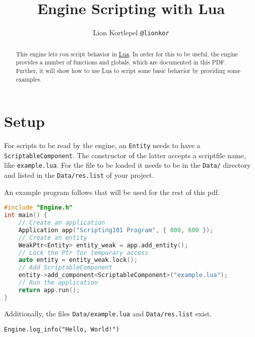 \documentclass[12pt,a4paper]{article}
\title{Engine Scripting with Lua}
\author{Lion Kortlepel \texttt{@lionkor}}
\begin{document}
\begin{titlepage}
\clearpage\maketitle
\thispagestyle{empty}
\end{titlepage}


\tableofcontents
\pagebreak

\begin{abstract}
This engine lets you script behavior in \href{https://www.lua.org/about.html}{Lua}. 
In order for this to be useful, the engine provides a number of functions and globals, which are documented in this PDF. Further, it will show how to use Lua to script some basic behavior by providing some examples.

\end{abstract}

\pagebreak

\setcounter{page}{1}

\section{Setup}

For scripts to be read by the engine, an \texttt{Entity} needs to have a  \texttt{ScriptableComponent}. The constructor of the latter accepts a scriptfile name, like \texttt{example.lua}. For the file to be loaded it needs to be in the \texttt{Data/} directory and listed in the \texttt{Data/res.list} of your project.

An example program follows that will be used for the rest of this pdf.

\begin{lstlisting}[language=C++,title=example.cpp]
#include "Engine.h"
int main() {
	// Create an application
	Application app("Scripting101 Program", { 800, 600 });
	// Create an entity
	WeakPtr<Entity> entity_weak = app.add_entity();
	// Lock the Ptr for temporary access
	auto entity = entity_weak.lock();
	// Add ScriptableComponent
	entity->add_component<ScriptableComponent>("example.lua");
	// Run the application
	return app.run();
}
\end{lstlisting}

Additionally, the files \texttt{Data/example.lua} and \texttt{Data/res.list} exist.

\begin{lstlisting}[language={[5.0]Lua},title=Data/example.lua]
Engine.log_info("Hello, World!")
\end{lstlisting}
\end{document}
